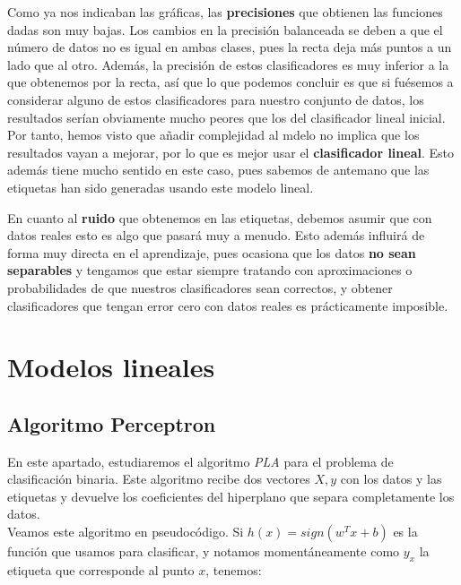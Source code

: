 \documentclass[12pt]{article}
\begin{document}
{Como ya nos indicaban las gráficas, las \textbf{precisiones} que obtienen las funciones dadas son muy bajas. Los cambios en la precisión balanceada se deben a que el número de datos no es igual en ambas clases, pues la recta deja más puntos a un lado que al otro. Además, la precisión de estos clasificadores es muy inferior a la que obtenemos por la recta, así que lo que podemos concluir es que si fuésemos a considerar alguno de estos clasificadores para nuestro conjunto de datos, los resultados serían obviamente mucho peores que los del clasificador lineal inicial. Por tanto, hemos visto que añadir complejidad al mdelo no implica que los resultados vayan a mejorar, por lo que es mejor usar el \textbf{clasificador lineal}. Esto además tiene mucho sentido en este caso, pues sabemos de antemano que las etiquetas han sido generadas usando este modelo lineal.

En cuanto al \textbf{ruido} que obtenemos en las etiquetas, debemos asumir que con datos reales esto es algo que pasará muy a menudo. Esto además influirá de forma muy directa en el aprendizaje, pues ocasiona que los datos \textbf{no sean separables} y tengamos que estar siempre tratando con aproximaciones o probabilidades de que nuestros clasificadores sean correctos, y obtener clasificadores que tengan error cero con datos reales es prácticamente imposible.


\section*{Modelos lineales}

\subsection*{Algoritmo Perceptron}

En este apartado, estudiaremos el algoritmo \emph{PLA} para el problema de clasificación binaria. Este algoritmo recibe dos vectores $X,y$ con los datos y las etiquetas y devuelve los coeficientes del hiperplano que separa completamente los datos. \\

Veamos este algoritmo en pseudocódigo. Si $h(x) = sign( w^T x + b)$ es la función que usamos para clasificar, y notamos momentáneamente como $y_x$ la etiqueta que corresponde al punto $x$, tenemos:


\begin{algorithm}[H]
  \SetAlgoLined


\end{algorithm}}
\end{document}
